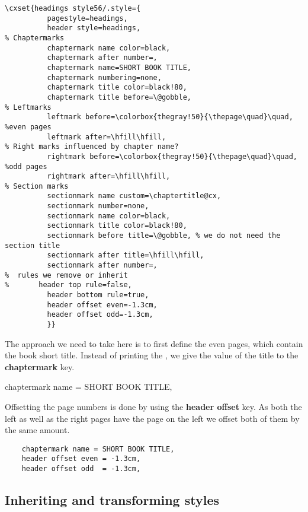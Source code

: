 \begin{tcolorbox}
\begin{lstlisting}
\cxset{headings style56/.style={
          pagestyle=headings,
          header style=headings,
% Chaptermarks
          chaptermark name color=black,
          chaptermark after number=,
          chaptermark name=SHORT BOOK TITLE,
          chaptermark numbering=none,
          chaptermark title color=black!80,
          chaptermark title before=\@gobble,
% Leftmarks
          leftmark before=\colorbox{thegray!50}{\thepage\quad}\quad, %even pages
          leftmark after=\hfill\hfill,
% Right marks influenced by chapter name?
          rightmark before=\colorbox{thegray!50}{\thepage\quad}\quad, %odd pages
          rightmark after=\hfill\hfill,
% Section marks
          sectionmark name custom=\chaptertitle@cx,
          sectionmark number=none,
          sectionmark name color=black,
          sectionmark title color=black!80,
          sectionmark before title=\@gobble, % we do not need the section title
          sectionmark after title=\hfill\hfill,
          sectionmark after number=,
%  rules we remove or inherit
%       header top rule=false,
          header bottom rule=true,
          header offset even=-1.3cm,
          header offset odd=-1.3cm,
          }}
\end{lstlisting}
\end{tcolorbox}

The approach we need to take here is to first define the even pages, which contain the book short title. Instead of printing the , we give the value of the title to the \textbf{chaptermark} key.

\begin{tcolorbox}
   chaptermark name = SHORT BOOK TITLE,
\end{tcolorbox}

Offsetting the page numbers is done by using the \textbf{header offset} key. As both the left as well as the right pages have the page on the left we offset both of them by the same amount.

\begin{tcolorbox}
\begin{lstlisting}
    chaptermark name = SHORT BOOK TITLE,
    header offset even = -1.3cm,
    header offset odd  = -1.3cm,
\end{lstlisting}
\end{tcolorbox}

\subsection{Inheriting and transforming styles}

